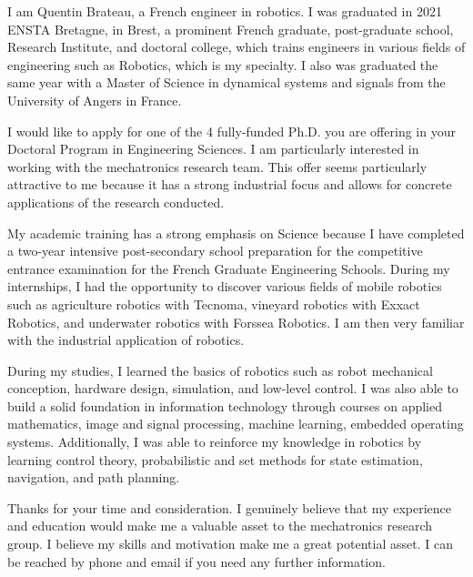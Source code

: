 \documentclass[11pt, a4paper]{awesome-cv}
\begin{document}
	\makecvheader[C]


	\makelettertitle

	\begin{cvletter}

		I am Quentin Brateau, a French engineer in robotics. I was graduated in 2021 ENSTA Bretagne, in Brest, a prominent French graduate, post-graduate school, Research Institute, and doctoral college, which trains engineers in various fields of engineering such as Robotics, which is my specialty. I also was graduated the same year with a Master of Science in dynamical systems and signals from the University of Angers in France.

		I would like to apply for one of the 4 fully-funded Ph.D. you are offering in your Doctoral Program in Engineering Sciences. I am particularly interested in working with the mechatronics research team. This offer seems particularly attractive to me because it has a strong industrial focus and allows for concrete applications of the research conducted.

		My academic training has a strong emphasis on Science because I have completed a two-year intensive post-secondary school preparation for the competitive entrance examination for the French Graduate Engineering Schools. During my internships, I had the opportunity to discover various fields of mobile robotics such as agriculture robotics with Tecnoma, vineyard robotics with Exxact Robotics, and underwater robotics with Forssea Robotics. I am then very familiar with the industrial application of robotics.

		During my studies, I learned the basics of robotics such as robot mechanical conception, hardware design, simulation, and low-level control. I was also able to build a solid foundation in information technology through courses on applied mathematics, image and signal processing, machine learning, embedded operating systems. Additionally, I was able to reinforce my knowledge in robotics by learning control theory, probabilistic and set methods for state estimation, navigation, and path planning.

		Thanks for your time and consideration. I genuinely believe that my experience and education would make me a valuable asset to the mechatronics research group. I believe my skills and motivation make me a great potential asset. I can be reached by phone and email if you need any further information.


\end{cvletter}
\end{document}
